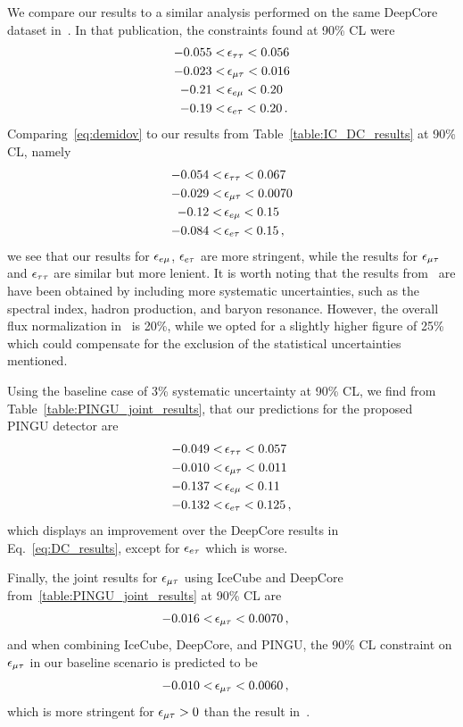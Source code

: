 {{We compare our results to a similar analysis performed on the same DeepCore dataset in~\cite{demidov}. In that publication, 
the constraints found at 90\% CL were 
\begin{align}\label{eq:demidov}
   -0.055 <&\, \epsilon_{\tau\tau} < 0.056 \nonumber \\
   -0.023 <&\, \epsilon_{\mu\tau} < 0.016 \nonumber \\
   -0.21 <&\, \epsilon_{e\mu} < 0.20 \nonumber \\
   -0.19 <&\, \epsilon_{e\tau} < 0.20\,.
\end{align}
Comparing~\ref{eq:demidov} to our results from Table~\ref{table:IC_DC_results} at 90\% CL, namely
\begin{align}\label{eq:DC_results}
   -0.054 <&\, \epsilon_{\tau\tau} < 0.067 \nonumber \\
   -0.029 <&\, \epsilon_{\mu\tau} < 0.0070 \nonumber \\
   -0.12 <&\, \epsilon_{e\mu} < 0.15 \nonumber \\
   -0.084 <&\, \epsilon_{e\tau} < 0.15\,,
\end{align}
we see that our results for $\epsilon_{e\mu}$, $\epsilon_{e\tau}$ are more stringent, while the results for $\epsilon_{\mu\tau}$ and $\epsilon_{\tau\tau}$ are similar but more lenient. It is worth noting that the 
results from~\cite{demidov} are have been obtained by including more systematic uncertainties, such as the spectral index, hadron production, and baryon resonance. 
However, the overall flux normalization in~\cite{demidov} is 20\%, while we opted for a slightly higher figure of 25\% which could compensate for the exclusion of the 
statistical uncertainties mentioned.

Using the baseline case of 3\% systematic uncertainty at 90\% CL, we find from Table~\ref{table:PINGU_joint_results}, that our predictions for the proposed PINGU detector are
\begin{align}\label{eq_P_results}
   -0.049 <&\, \epsilon_{\tau\tau} < 0.057 \nonumber \\
   -0.010 <&\, \epsilon_{\mu\tau} < 0.011 \nonumber \\
   -0.137 <&\, \epsilon_{e\mu} < 0.11 \nonumber \\
   -0.132 <&\, \epsilon_{e\tau} < 0.125\,,
\end{align}
which displays an improvement over the DeepCore results in Eq.~\ref{eq:DC_results}, except for $\epsilon_{e\tau}$ which is worse.

Finally, the joint results for $\epsilon_{\mu\tau}$ using IceCube and DeepCore from~\ref{table:PINGU_joint_results} at 90\% CL are
\begin{align}\label{eq:ID_result}
   -0.016 <&\, \epsilon_{\mu\tau} < 0.0070\,,
\end{align}
and when combining IceCube, DeepCore, and PINGU, the 90\% CL constraint on $\epsilon_{\mu\tau}$ in our baseline scenario is predicted to be
\begin{align}\label{eq:PID_result}
   -0.010 <&\, \epsilon_{\mu\tau} < 0.0060\,,
\end{align}
which is more stringent for $\epsilon_{\mu\tau}>0$ than the result in~\cite{deepcoreNSI}.
\newpage


}}
